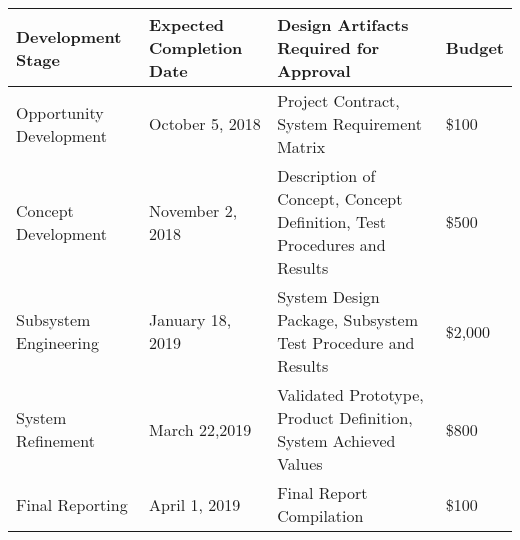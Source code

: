 

\begin{table}[h!]

\begin{tabular}{|p{4cm}|p{3.5cm}|p{5.4cm}|p{1.5cm}|}
 \hline	
\rowcolor[HTML]{C0C0C0}	
{\color[HTML]{000000} \textbf{Development Stage}} & {\color[HTML]{000000} \textbf{Expected Completion Date}} & {\color[HTML]{000000} \textbf{Design Artifacts Required for Approval}} & {\color[HTML]{000000} \textbf{Budget}}\\ \hline	
Opportunity Development & October 5, 2018 & Project Contract, System Requirement Matrix & \$100 \\ \hline	
Concept Development & November 2, 2018 & Description of Concept, Concept Definition, Test Procedures and Results & \$500 \\ \hline	
Subsystem Engineering & January 18, 2019 & System Design Package, Subsystem Test Procedure and Results & \$2,000\\ \hline	
System Refinement & March 22,2019 & Validated Prototype, Product Definition, System Achieved Values & \$800\\ \hline	
Final Reporting & April 1, 2019 & Final Report Compilation & \$100 \\ \hline	

  \hline  
\end{tabular}

\end{table}
